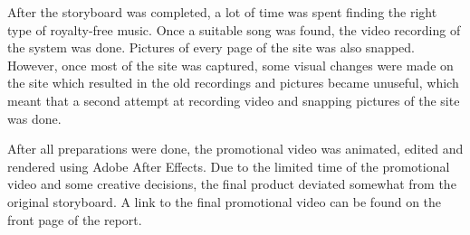 After the storyboard was completed, a lot of time was spent finding the right type of royalty-free music. Once a suitable song was found, the video recording of the system was done. Pictures of every page of the site was also snapped. However, once most of the site was captured, some visual changes were made on the site which resulted in the old recordings and pictures became unuseful, which meant that a second attempt at recording video and snapping pictures of the site was done.

After all preparations were done, the promotional video was animated, edited and rendered using Adobe After Effects. Due to the limited time of the promotional video and some creative decisions, the final product deviated somewhat from the original storyboard. A link to the final promotional video can be found on the front page of the report.
